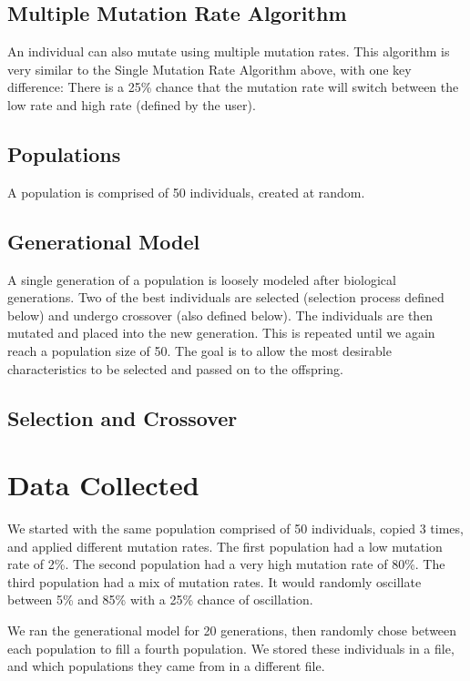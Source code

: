 \documentclass[a4paper, 12pt, one column]{article}
\begin{document}
\begin{multicols}{2}
\subsection{Multiple Mutation Rate Algorithm}

An individual can also mutate using multiple mutation rates. This algorithm is very similar to the Single Mutation Rate Algorithm above, with one key difference: There is a 25\% chance that the mutation rate will switch between the low rate and high rate (defined by the user). 

\subsection{Populations}

A population is comprised of 50 individuals, created at random.

\subsection{Generational Model}

A single generation of a population is loosely modeled after biological generations. Two of the best individuals are selected (selection process defined below) and undergo crossover (also defined below). The individuals are then mutated and placed into the new generation. This is repeated until we again reach a population size of 50. The goal is to allow the most desirable characteristics to be selected and passed on to the offspring.

\subsection{Selection and Crossover}

\section{Data Collected}

\par We started with the same population comprised of 50 individuals, copied 3 times, and applied different mutation rates. The first population had a low mutation rate of 2\%. The second population had a very high mutation rate of 80\%. The third population had a mix of mutation rates. It would randomly oscillate between 5\% and 85\% with a 25\% chance of oscillation. 

We ran the generational model for 20 generations, then randomly chose between each population to fill a fourth population. We stored these individuals in a file, and which populations they came from in a different file. 


\end{multicols}
\end{document}
